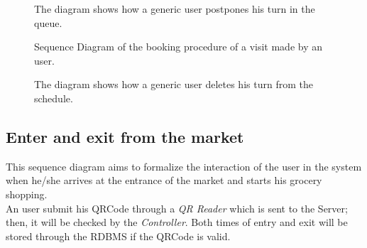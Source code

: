 \begin{figure}[H]
  \label{PostponeReservationSD}
  \centering
    \caption{The diagram shows how a generic user postpones his turn in the queue. }
\end{figure} 


\begin{figure}[H]
  \label{VisitSD}
  \centering
    \caption{Sequence Diagram of the booking procedure of a visit made by an user.}
\end{figure} 




\begin{figure}[H]
  \label{DeleteVisitSD}
  \centering
    \caption{The diagram shows how a generic user deletes his turn from the schedule.}
\end{figure} 


\subsection{Enter and exit from the market}
This sequence diagram aims to formalize the interaction of the user in the system when he/she arrives at the entrance of the market and starts his grocery shopping.\\
An user submit his QRCode through a \textit{QR Reader} which is sent to the Server; then, it will be checked by the \textit{Controller}. Both times of entry and exit will be stored through the RDBMS if the QRCode is valid.

